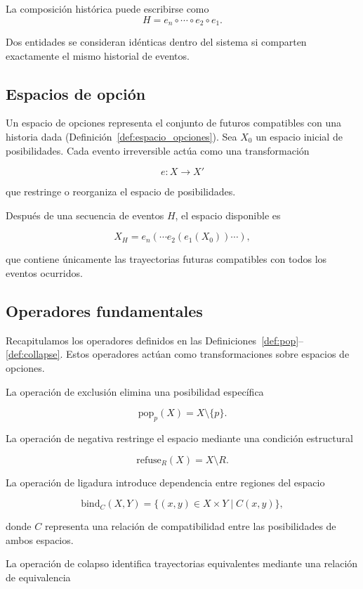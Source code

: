 \documentclass[12pt]{article}
\theoremstyle{plain}
\theoremstyle{definition}
\begin{document}
La composición histórica puede escribirse como
\[
H = e_n \circ \cdots \circ e_2 \circ e_1 .
\]

Dos entidades se consideran idénticas dentro del sistema si comparten exactamente el mismo historial de eventos.

\subsection{Espacios de opción}

Un espacio de opciones representa el conjunto de futuros compatibles con una historia dada (Definición~\ref{def:espacio_opciones}). Sea $X_0$ un espacio inicial de posibilidades. Cada evento irreversible actúa como una transformación

\[
e : X \rightarrow X'
\]

que restringe o reorganiza el espacio de posibilidades.

Después de una secuencia de eventos $H$, el espacio disponible es

\[
X_H = e_n(\cdots e_2(e_1(X_0))\cdots),
\]

que contiene únicamente las trayectorias futuras compatibles con todos los eventos ocurridos.

\subsection{Operadores fundamentales}

Recapitulamos los operadores definidos en las Definiciones~\ref{def:pop}--\ref{def:collapse}. Estos operadores actúan como transformaciones sobre espacios de opciones.

La operación de exclusión elimina una posibilidad específica

\[
\mathrm{pop}_p(X) = X \setminus \{p\}.
\]

La operación de negativa restringe el espacio mediante una condición estructural

\[
\mathrm{refuse}_R(X) = X \setminus R.
\]

La operación de ligadura introduce dependencia entre regiones del espacio

\[
\mathrm{bind}_C(X,Y) =
\{(x,y) \in X \times Y \mid C(x,y)\},
\]

donde $C$ representa una relación de compatibilidad entre las posibilidades de ambos espacios.

La operación de colapso identifica trayectorias equivalentes mediante una relación de equivalencia
\end{document}
